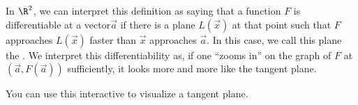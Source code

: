\documentclass{ximera}
\begin{document}
%
%
%
%
%



In $\R^2$, we can interpret this definition as saying that a function
$F$ is differentiable at a vector$\vec{a}$ if there is a plane
$L(\vec{x})$ at that point such that $F$ approaches
$L(\vec{x})$ faster than $\vec{x}$ approaches $\vec{a}$.  In
this case, we call this plane the .  We interpret
this differentiability as, if one ``zooms in'' on the graph of $F$ at
$(\vec{a}, F(\vec{a}))$ sufficiently, it looks more and more like the
tangent plane.

\begin{onlineOnly}
  You can use this interactive to visualize a tangent plane.
  \begin{center}
  \end{center}
\end{onlineOnly}
\end{document}
